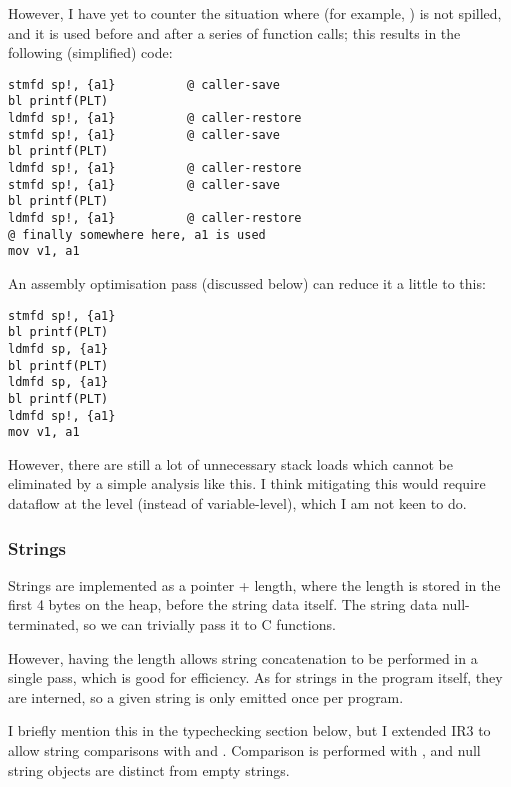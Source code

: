 \documentclass[12pt]{article}
\begin{document}
However, I have yet to counter the situation where (for example, ) is not spilled, and it is used before
and after a series of function calls; this results in the following (simplified) code:

\begin{verbatim}
stmfd sp!, {a1}          @ caller-save
bl printf(PLT)
ldmfd sp!, {a1}          @ caller-restore
stmfd sp!, {a1}          @ caller-save
bl printf(PLT)
ldmfd sp!, {a1}          @ caller-restore
stmfd sp!, {a1}          @ caller-save
bl printf(PLT)
ldmfd sp!, {a1}          @ caller-restore
@ finally somewhere here, a1 is used
mov v1, a1
\end{verbatim}

An assembly optimisation pass (discussed below) can reduce it a little to this:


\begin{verbatim}
stmfd sp!, {a1}
bl printf(PLT)
ldmfd sp, {a1}
bl printf(PLT)
ldmfd sp, {a1}
bl printf(PLT)
ldmfd sp!, {a1}
mov v1, a1
\end{verbatim}

However, there are still a lot of unnecessary stack loads which cannot be eliminated by a simple analysis like this.
I think mitigating this would require dataflow at the  level (instead of variable-level), which
I am not keen to do.








\subsubsection{Strings}

Strings are implemented as a pointer + length, where the length is stored in the first 4 bytes on the heap,
before the string data itself. The string data  null-terminated, so we can trivially pass it to C functions.

However, having the length allows string concatenation to be performed in a single pass, which is good for efficiency.
As for strings in the program itself, they are interned, so a given string is only emitted once per program.

I briefly mention this in the typechecking section below, but I extended IR3 to allow string comparisons with \eqtt{==}
and \eqtt{!=}. Comparison is performed with , and null string objects are distinct from empty strings.
\end{document}
